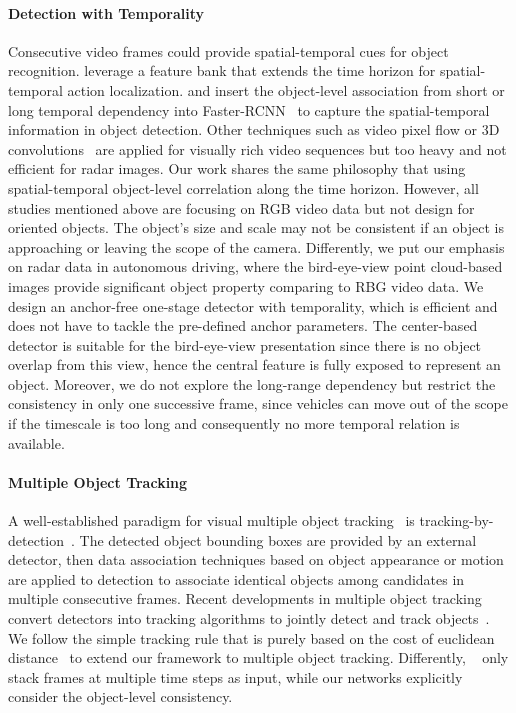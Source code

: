 \documentclass[10pt,twocolumn,letterpaper]{article}
\begin{document}
\vspace{-4mm}
\paragraph{Detection with Temporality} Consecutive video frames could provide spatial-temporal cues for object recognition. \cite{wu2019long} leverage a feature bank that extends the time horizon for spatial-temporal action localization. \cite{shvets2019leveraging} and \cite{beery2020context} insert the object-level association from short or long temporal dependency into Faster-RCNN~\cite{ren2015faster} to capture the spatial-temporal information in object detection. Other techniques such as video pixel flow or 3D convolutions~\cite{zhu2017deep,zhu2017flow,xie2018rethinking} are applied for visually rich video sequences but too heavy and not efficient for radar images. Our work shares the same philosophy that using spatial-temporal object-level correlation along the time horizon. However, all studies mentioned above are focusing on RGB video data but not design for oriented objects. The object's size and scale may not be consistent if an object is approaching or leaving the scope of the camera. Differently, we put our emphasis on radar data in autonomous driving, where the bird-eye-view point cloud-based images provide significant object property comparing to RBG video data. We design an anchor-free one-stage detector with temporality, which is efficient and does not have to tackle the pre-defined anchor parameters. The center-based detector is suitable for the bird-eye-view presentation since there is no object overlap from this view, hence the central feature is fully exposed to represent an object. Moreover, we do not explore the long-range dependency but restrict the consistency in only one successive frame, since vehicles can move out of the scope if the timescale is too long and consequently no more temporal relation is available.

\vspace{-4mm}
\paragraph{Multiple Object Tracking} A well-established paradigm for visual multiple object tracking~\cite{milan2016mot16} is tracking-by-detection~\cite{jiang2019graph,schulter2017deep,tang2017multiple}. The detected object bounding boxes are provided by an external detector, then data association techniques based on object appearance or motion are applied to detection to associate identical objects among candidates in multiple consecutive frames. Recent developments in multiple object tracking convert detectors into tracking algorithms to jointly detect and track objects~\cite{zhou2020tracking,feichtenhofer2017detect,yin2021center}. We follow the simple tracking rule that is purely based on the cost of euclidean distance~\cite{zhou2020tracking,yin2021center} to extend our framework to multiple object tracking. Differently, ~\cite{zhou2020tracking,yin2021center} only stack frames at multiple time steps as input, while our networks explicitly consider the object-level consistency.
\end{document}
